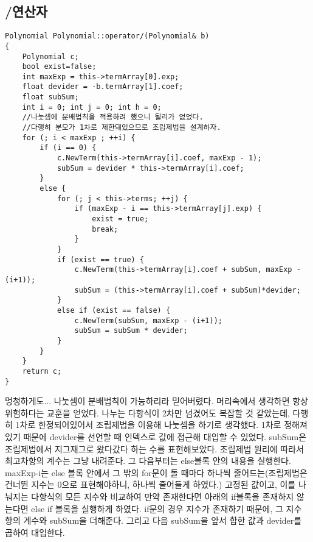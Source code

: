 \documentclass[a4paper,11pt]{article}
\begin{document}
\subsection{/연산자}
\begin{Verbatim}
Polynomial Polynomial::operator/(Polynomial& b)
{
	Polynomial c;	
	bool exist=false;
	int maxExp = this->termArray[0].exp;
	float devider = -b.termArray[1].coef;
	float subSum;
	int i = 0; int j = 0; int h = 0;
	//나눗셈에 분배법칙을 적용하려 했으니 될리가 없었다.
	//다행히 분모가 1차로 제한돼있으므로 조립제법을 설계하자.
	for (; i < maxExp ; ++i) {
		if (i == 0) {
			c.NewTerm(this->termArray[i].coef, maxExp - 1);
			subSum = devider * this->termArray[i].coef;
		}
		else {
			for (; j < this->terms; ++j) {
				if (maxExp - i == this->termArray[j].exp) {
					exist = true;
					break;
				}
			}
			if (exist == true) {
				c.NewTerm(this->termArray[i].coef + subSum, maxExp - (i+1));
				subSum = (this->termArray[i].coef + subSum)*devider;
			}
			else if (exist == false) {
				c.NewTerm(subSum, maxExp - (i+1));
				subSum = subSum * devider;
			}
		}
	}
	return c;
}
\end{Verbatim}
멍청하게도... 나눗셈이 분배법칙이 가능하리라 믿어버렸다. 머리속에서 생각하면 항상 위험하다는 교훈을 얻었다. 나누는 다항식이 2차만 넘겼어도 복잡할 것 같았는데, 다행히 1차로 한정되어있어서 조립제법을 이용해 나눗셈을 하기로 생각했다. 1차로 정해져있기 때문에 devider를 선언할 때 인덱스로 값에 접근해 대입할 수 있었다. subSum은 조립제법에서 지그재그로 왔다갔다 하는 수를 표현해보았다. 조립제법 원리에 따라서 최고차항의 계수는 그냥 내려준다.  그 다음부터는 else블록 안의 내용을 실행한다. maxExp-i는 else 블록 안에서 그 밖의 for문이 돌 때마다 하나씩 줄어드는(조립제법은 건너뛴 지수는 0으로 표현해야하니, 하나씩 줄어들게 하였다.)  고정된 값이고, 이를 나눠지는 다항식의 모든 지수와 비교하여 만약 존재한다면 아래의 if블록을 존재하지 않는다면 else if 블록을 실행하게 하였다. if문의 경우 지수가 존재하기 때문에, 그 지수 항의 계수와 subSum을 더해준다. 그리고 다음 subSum을 앞서 합한 값과 devider를 곱하여 대입한다. 
\end{document}
